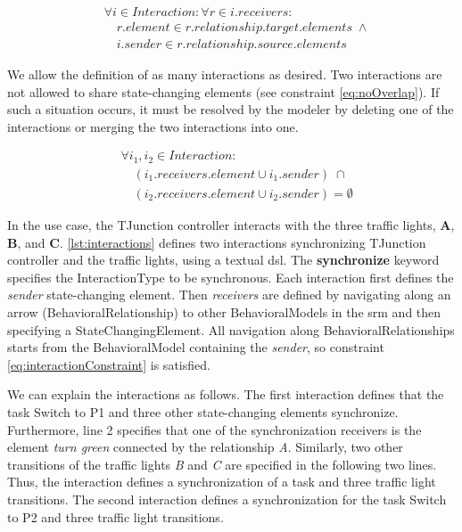 \documentclass{jot}
\begin{document}
\begin{equation} \label{eq:interactionConstraint}
    \begin{aligned}
    & \forall i \in Interaction: \forall r \in i.receivers : \\
    & \quad r.element \in r.relationship.target.elements \; \wedge \\
    & \quad i.sender \in r.relationship.source.elements
    \end{aligned}
\end{equation}

We allow the definition of as many interactions as desired.
Two interactions are not allowed to share state-changing elements (see constraint \eqref{eq:noOverlap}).
If such a situation occurs, it must be resolved by the modeler by deleting one of the interactions or merging the two interactions into one.

\begin{equation} \label{eq:noOverlap}
    \begin{aligned}
    & \forall i_1,i_2 \in Interaction : \\
    & \quad (i_1.receivers.element \cup i_1.sender) \; \cap \\
    & \quad (i_2.receivers.element \cup i_2.sender) = \emptyset
    \end{aligned}
\end{equation}

In the use case, the TJunction controller interacts with the three traffic lights, \textbf{A}, \textbf{B}, and \textbf{C}.
\autoref{lst:interactions} defines two interactions synchronizing TJunction controller and the traffic lights, using a textual \gls*{dsl}.
The \textbf{synchronize} keyword specifies the \textsf{InteractionType} to be \textsf{synchronous}.
Each interaction first defines the \textit{sender} state-changing element.
Then \textit{receivers} are defined by navigating along an arrow (\textsf{BehavioralRelationship}) to other \textsf{BehavioralModel}s in the \gls*{srm} and then specifying a \textsf{StateChangingElement}.
All navigation along \textsf{BehavioralRelationship}s starts from the \textsf{BehavioralModel} containing the \textit{sender}, so constraint \eqref{eq:interactionConstraint} is satisfied.



We can explain the interactions as follows.
The first interaction defines that the task \textsf{Switch to P1} and three other state-changing elements synchronize.
Furthermore, line 2 specifies that one of the synchronization receivers is the element \textit{turn green} connected by the relationship \textit{A}.
Similarly, two other transitions of the traffic lights \textit{B} and \textit{C} are specified in the following two lines.
Thus, the interaction defines a synchronization of a task and three traffic light transitions. 
The second interaction defines a synchronization for the task \textsf{Switch to P2} and three traffic light transitions.
\end{document}
